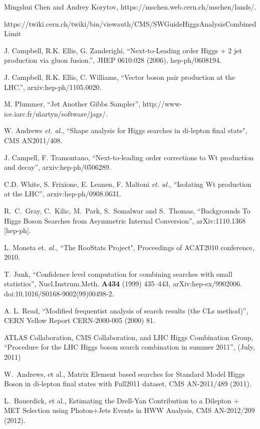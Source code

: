 Mingshui Chen and Andrey Korytov, https://mschen.web.cern.ch/mschen/lands/.

https://twiki.cern.ch/twiki/bin/viewauth/CMS/SWGuideHiggsAnalysisCombinedLimit

J. Campbell, R.K. Ellis, G. Zanderighi, ``Next-to-Leading order Higgs + 2 jet production via gluon fusion.'', JHEP 0610:028 (2006), hep-ph/0608194.

J. Campbell, R.K. Ellis, C. Williams, ``Vector boson pair production at the LHC.'', arxiv:hep-ph/1105.0020.

M. Plummer, ``Jet Another Gibbs Sampler'', http://www-ice.iarc.fr/\~martyn/software/jags/.

W. Andrews {\it et. al.}, ``Shape analysis for Higgs searches in di-lepton final state", 
CMS AN2011/408.

J. Campell, F. Tramontano, ``Next-to-leading order corrections to Wt production and decay'', arxiv:hep-ph/0506289.

C.D. White, S. Frixione, E. Leanen, F. Maltoni {\it et. al.}, ``Isolating Wt production at the LHC'', arxiv:hep-ph/0908.0631.

  R.~C.~Gray, C.~Kilic, M.~Park, S.~Somalwar and S.~Thomas,
  ``Backgrounds To Higgs Boson Searches from Asymmetric Internal Conversion'',
  arXiv:1110.1368 [hep-ph].

L. Moneta et. {\it al.}, ``The RooStats Project", Proceedings of ACAT2010 conference, 2010.

T. Junk, ``Confidence level computation for combining searches with small statistics'', 
Nucl.Instrum.Meth. {\bf A434} (1999) 435–443, arXiv:hep-ex/9902006. 
doi:10.1016/S0168-9002(99)00498-2.

A. L. Read, ``Modified frequentist analysis of search results (the CLs method)'', 
CERN Yellow Report CERN-2000-005 (2000) 81.

ATLAS Collaboration, CMS Collaboration, and LHC Higgs Combination Group, 
``Procedure for the LHC Higgs boson search combination in summer 2011'', (July, 2011)

W.~Andrews, et al., {Matrix Element based searches for Standard Model Higgs Boson in di-lepton final states with Full2011 dataset}, CMS AN-2011/489 (2011).

L.~Bauerdick, et al., {Estimating the Drell-Yan Contribution to a Dilepton + MET Selection using Photon+Jets Events in HWW Analysis}, CMS AN-2012/209 (2012).
